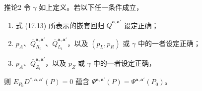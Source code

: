 \begin{bookresult}{推论}{2}
令 $\gamma$ 如上定义。若以下任一条件成立，
\begin{enumerate}[label=R\arabic*.,leftmargin=2.8em]
 \item 式 (17.13) 所表示的嵌套回归 $\bar Q^{\mathbf a,\mathbf a'}$ 设定正确；
 \item $p_A$、$\bar Q_{R_t}^{\mathbf a,\mathbf a'}$、$\bar Q_{L_t}^{\mathbf a,\mathbf a'}$，以及 $(p_L,p_R)$ 或 $\gamma$ 中的一者设定正确；
 \item $p_A$、$\bar Q_{Z_t}^{\mathbf a,\mathbf a'}$，以及 $p_Z$ 或 $\gamma$ 中的一者设定正确，
\end{enumerate}
则 $E_{P_0}D^{*,\mathbf a,\mathbf a'}(P)=0$ 蕴含 $\Psi^{\mathbf a,\mathbf a'}(P)=\Psi^{\mathbf a,\mathbf a'}(P_0)$。
\end{bookresult}
